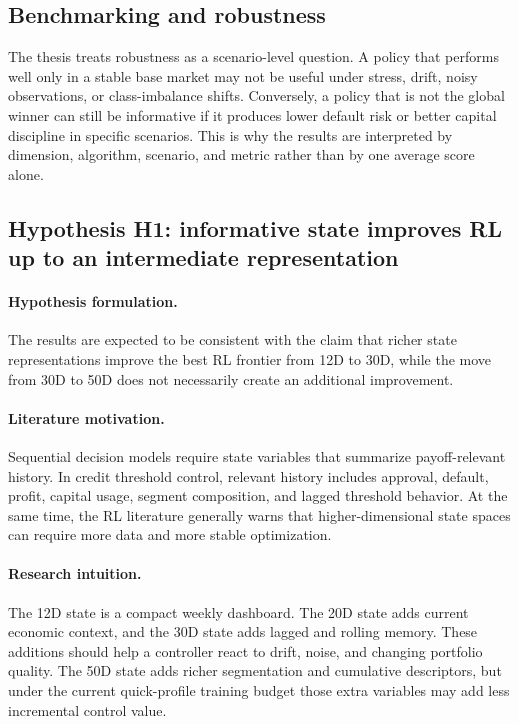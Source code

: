 \documentclass[12pt,a4paper]{article}
\begin{document}
\subsection{Benchmarking and robustness}

The thesis treats robustness as a scenario-level question. A policy that performs well only in a stable base market may not be useful under stress, drift, noisy observations, or class-imbalance shifts. Conversely, a policy that is not the global winner can still be informative if it produces lower default risk or better capital discipline in specific scenarios. This is why the results are interpreted by dimension, algorithm, scenario, and metric rather than by one average score alone.

\subsection{Hypothesis H1: informative state improves RL up to an intermediate representation}
\label{sec:hypotheses}

\paragraph{Hypothesis formulation.}
The results are expected to be consistent with the claim that richer state representations improve the best RL frontier from 12D to 30D, while the move from 30D to 50D does not necessarily create an additional improvement.

\paragraph{Literature motivation.}
Sequential decision models require state variables that summarize payoff-relevant history. In credit threshold control, relevant history includes approval, default, profit, capital usage, segment composition, and lagged threshold behavior. At the same time, the RL literature generally warns that higher-dimensional state spaces can require more data and more stable optimization.

\paragraph{Research intuition.}
The 12D state is a compact weekly dashboard. The 20D state adds current economic context, and the 30D state adds lagged and rolling memory. These additions should help a controller react to drift, noise, and changing portfolio quality. The 50D state adds richer segmentation and cumulative descriptors, but under the current quick-profile training budget those extra variables may add less incremental control value.
\end{document}
